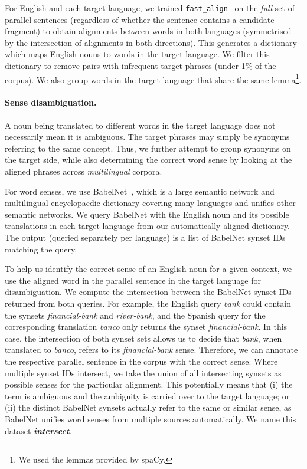 \documentclass[twocolumn]{svjour3}          \smartqed  \usepackage{graphicx}
\begin{document}
For English and each target language, we trained \texttt{fast\_align}~\cite{DyerEtAl:2013} on the \emph{full} set of parallel sentences (regardless of whether the sentence contains a candidate fragment) to obtain alignments between words in both languages (symmetrised by the intersection of alignments in both directions). This generates a dictionary which maps English nouns to words in the target language. We filter this dictionary to remove pairs with infrequent target phrases (under 1\% of the corpus).
We also group words in the target language that share the same lemma\footnote{We used the lemmas provided by spaCy.}.


\paragraph{Sense disambiguation.} A noun being translated to different words in the target language does not necessarily mean it is ambiguous. The target phrases may simply be synonyms referring to the same concept. Thus, we further attempt to group synonyms on the target side, while also determining the correct word sense by looking at the aligned phrases across \emph{multilingual} corpora. 

For word senses, we use BabelNet~\cite{NavigliPonzetto:2012}, which is a large semantic network and multilingual encyclopaedic dictionary covering many languages and unifies other semantic networks. We query BabelNet with the English noun and its possible translations in each target language from our automatically aligned dictionary. The output (queried separately per language) is a list of BabelNet synset IDs matching the query.  

To help us identify the correct sense of an English noun for a given context, we use the aligned word in the parallel sentence in the target language for disambiguation. We compute the intersection between the BabelNet synset IDs returned from both queries. For example, the English query \emph{bank} could contain the synsets \emph{financial-bank} and \emph{river-bank}, and the Spanish query for the corresponding translation \emph{banco} only returns the synset \emph{financial-bank}. In this case, the intersection of both synset sets allows us to decide that \emph{bank}, when translated to \emph{banco}, refers to its \emph{financial-bank} sense. Therefore, we can annotate the respective parallel sentence in the corpus with the correct sense. Where multiple synset IDs intersect, we take the union of all intersecting synsets as possible senses for the particular alignment. This potentially means that (i) the term is ambiguous and the ambiguity is carried over to the target language; or (ii) the distinct BabelNet synsets actually refer to the same or similar sense, as BabelNet unifies word senses from multiple sources automatically. We name this dataset \textbf{\textit{intersect}}.
\end{document}
